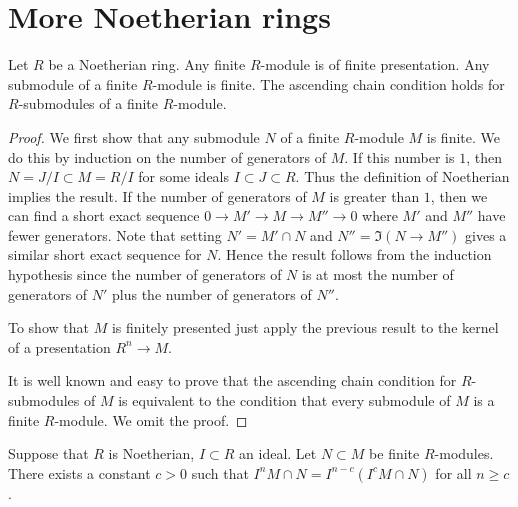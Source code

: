 \section{More Noetherian rings}
\label{section-Noetherian-again}


\begin{lemma}
\label{lemma-Noetherian-basic}
Let $R$ be a Noetherian ring.
Any finite $R$-module is of finite presentation.
Any submodule of a finite $R$-module is finite.
The ascending chain condition holds for $R$-submodules
of a finite $R$-module.
\end{lemma}

\begin{proof}
We first show that any submodule $N$ of a finite $R$-module
$M$ is finite. We do this by induction on the number of
generators of $M$. If this number is $1$, then $N = J/I \subset
M = R/I$ for some ideals $I \subset J \subset R$. Thus the definition
of Noetherian implies the result. If the number of generators of
$M$ is greater than $1$, then we can find a short exact sequence
$0 \to M' \to M \to M'' \to 0$ where $M'$ and $M''$ have fewer
generators. Note that setting $N' = M' \cap N$ and $N'' = \Im(N \to
M'')$ gives a similar short exact sequence for $N$. Hence the result
follows from the induction hypothesis
since the number of generators of $N$ is at most the number of
generators of $N'$ plus the number of generators of $N''$.

\medskip\noindent
To show that $M$ is finitely presented just apply the previous result
to the kernel of a presentation $R^n \to M$.

\medskip\noindent
It is well known and easy to prove that the ascending chain condition for
$R$-submodules of $M$ is equivalent to the condition that every submodule
of $M$ is a finite $R$-module. We omit the proof.
\end{proof}

\begin{lemma}
\label{lemma-Artin-Rees}
Suppose that $R$ is Noetherian, $I \subset R$ an ideal.
Let $N \subset M$ be finite $R$-modules.
There exists a constant $c > 0$ such that
$I^n M \cap N  =  I^{n-c}(I^cM \cap N)$ for all $n \geq c$.
\end{lemma}


